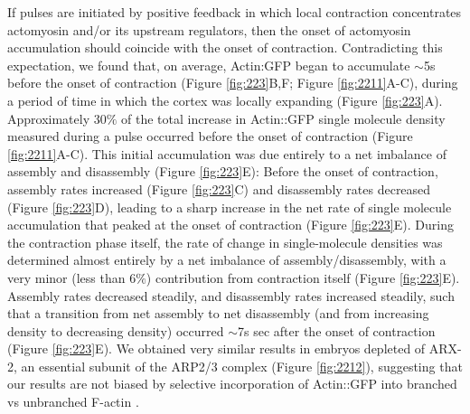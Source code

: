 If pulses are initiated by positive feedback in which local contraction concentrates actomyosin and/or its upstream regulators, then the onset of actomyosin accumulation should coincide with the onset of contraction. Contradicting this expectation, we found that, on average, Actin:GFP began to accumulate $\sim$5s before the onset of contraction (Figure \ref{fig:223}B,F; Figure \ref{fig:2211}A-C), during a period of time in which the cortex was locally expanding (Figure \ref{fig:223}A). Approximately 30$\%$ of the total increase in Actin::GFP single molecule density measured during a pulse occurred before the onset of contraction (Figure \ref{fig:2211}A-C). This initial accumulation was due entirely to a net imbalance of assembly and disassembly (Figure \ref{fig:223}E): Before the onset of contraction, assembly rates increased (Figure \ref{fig:223}C) and disassembly rates decreased (Figure \ref{fig:223}D), leading to a sharp increase in the net rate of single molecule accumulation that peaked at the onset of contraction (Figure \ref{fig:223}E).  During the contraction phase itself, the rate of change in single-molecule densities was determined almost entirely by a net imbalance of assembly/disassembly, with a very minor (less than 6$\%$) contribution from contraction itself (Figure \ref{fig:223}E). Assembly rates decreased steadily, and disassembly rates increased steadily, such that a transition from net assembly to net disassembly  (and from increasing density to decreasing density) occurred $\sim$7s sec after the onset of contraction (Figure \ref{fig:223}E).  We obtained very similar results in embryos depleted of ARX-2, an essential subunit of the ARP2/3 complex (Figure \ref{fig:2212}), suggesting that our results are not biased by selective incorporation of Actin::GFP into branched vs unbranched F-actin  \cite{Chen:2012dx}.

